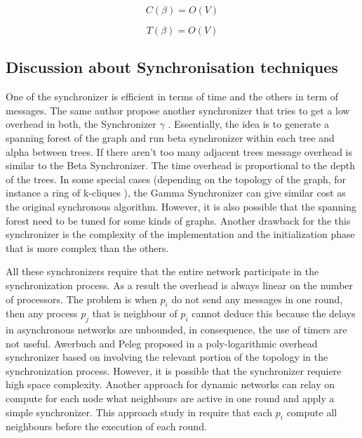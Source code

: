 \begin{equation}
\label{ec:message-beta}
 C(\beta) = O(V)
 \end{equation}

\begin{equation}
\label{ec:time-beta}
 T(\beta) = O(V) 
\end{equation}

\subsection{Discussion about Synchronisation techniques}

One of the synchronizer is efficient in terms of time and the others in term of messages. The same author propose \cite{awerbuch1985complexity} another synchronizer that tries to get a low overhead in both, the Synchronizer $\gamma$ . Essentially, the idea is to generate a spanning forest of the graph and run beta synchronizer within each tree and alpha between trees. If there aren't too many adjacent trees message overhead is similar to the Beta Synchronizer. The time overhead is proportional to the depth of the trees. In some special cases  (depending on the topology of the graph, for instance a ring of k-cliques \cite{lynch1996distributed}), the Gamma Synchronizer can give similar cost as the original synchronous algorithm. However, it is also possible that the spanning forest need to be tuned for some kinds of graphs. Another drawback for the this synchronizer is the complexity of the implementation and the initialization phase that is more complex than the others. 

All these synchronizers require that the entire network participate in the synchronization process. As a result the overhead is always linear on the number of processors. The problem is when $p_i$ do not send any messages in one round, then any process $p_j$ that is neighbour of $p_i$ cannot deduce this because the delays in asynchronous networks are unbounded, in consequence, the use of timers are not useful. Awerbuch and Peleg proposed in \cite{awerbuch1990network} a poly-logarithmic overhead synchronizer based on involving the relevant portion of the topology in the synchronization process. However, it is possible that the synchronizer requiere high space complexity. Another approach for dynamic networks can relay on compute for each node what neighbours are active in one round and apply a simple synchronizer. This approach study in \cite{AspnesW2007} require that each $p_i$ compute all neighbours before the execution of each round.

